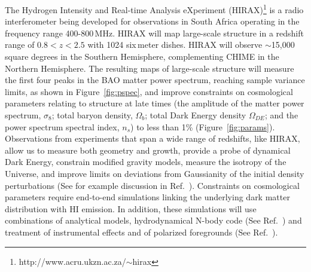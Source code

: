 \documentclass[]{spie}  %
\begin{document}
   
The Hydrogen Intensity and Real-time Analysis eXperiment (HIRAX)\footnote{http:\//\//www.acru.ukzn.ac.za\//$\sim$hirax} is a radio interferometer being developed for observations in South Africa operating in the frequency range 400-800\,MHz. HIRAX will map large-scale structure in a redshift range of $0.8 < z < 2.5$ with 1024 six\,meter dishes. HIRAX will observe $\sim$15,000 square degrees in the Southern Hemisphere, complementing CHIME \cite{2014SPIE.9145E..22B} in the Northern Hemisphere. The resulting maps of large-scale structure will measure the first four peaks in the BAO matter power spectrum, reaching sample variance limits, as shown in Figure~\ref{fig:pspec}, and improve constraints on cosmological parameters relating to structure at late times (the amplitude of the matter power spectrum, $\sigma_{8}$; total baryon density, $\Omega_{b}$; total Dark Energy density $\Omega_{DE}$; and the power spectrum spectral index, $n_{s}$) to less than 1\% (Figure~\ref{fig:params}). Observations from experiments that span a wide range of redshifts, like HIRAX, allow us to measure both geometry and growth, provide a probe of dynamical Dark Energy, constrain modified gravity models, measure the isotropy of the Universe, and improve limits on deviations from Gaussianity of the initial density perturbations (See for example discussion in Ref.~\cite{2015aska.confE..19S}). Constraints on cosmological parameters require end-to-end simulations linking the underlying dark matter distribution with HI emission. In addition, these simulations will use combinations of analytical models, hydrodynamical N-body code (See Ref.~\cite{2016arXiv160401418D}) and treatment of instrumental effects and of polarized foregrounds (See Ref.~\cite{2014MNRAS.444.3183A}).  \newline
\end{document}
